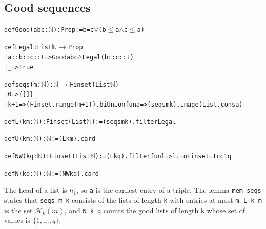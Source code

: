 \documentclass[11pt]{amsart}
\theoremstyle{definition}
\newcommand{\lean}[1]{\texttt{#1}}
\newcommand{\NN}{\mathbb{N}}
\begin{document}
\subsection*{Good sequences}
\begin{alltt}\small
def Good (a b c : \(\NN\)) : Prop := b = c \(\lor\) (b \(\le\) a \(\land\) c \(\le\) a)

def Legal : List \(\NN\) \(\to\) Prop
  | a :: b :: c :: t => Good a b c \(\land\) Legal (b :: c :: t)
  | _ => True

def seqs (m : \(\NN\)) : \(\NN\) \(\to\) Finset (List \(\NN\))
  | 0 => \{[]\}
  | k + 1 => (Finset.range (m + 1)).biUnion fun a => (seqs m k).image (List.cons a)

def L (k m : \(\NN\)) : Finset (List \(\NN\)) := (seqs m k).filter Legal

def U (k m : \(\NN\)) : \(\NN\) := (L k m).card

def NW (k q : \(\NN\)) : Finset (List \(\NN\)) := (L k q).filter fun l => l.toFinset = Icc 1 q

def N (k q : \(\NN\)) : \(\NN\) := (NW k q).card
\end{alltt}
The head of a list is $h_1$, so \lean{a} is the earliest entry of a triple. The lemma \lean{mem\_seqs} states that \lean{seqs m k} consists of the lists of length \lean{k} with entries at most \lean{m}; \lean{L k m} is the set $\mathcal H_k(m)$, and \mbox{\lean{N k q}} counts the good lists of length \lean{k} whose set of values is $\{1,\dots,q\}$.
\end{document}
